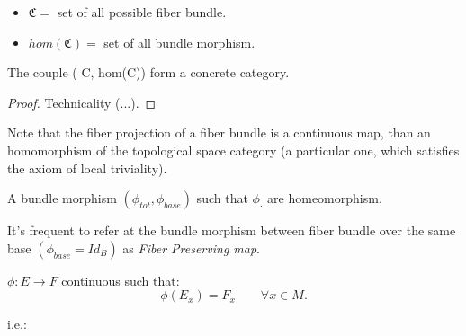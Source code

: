 \documentclass[a4paper,12pt]{scrartcl}    %
\begin{document}
\begin{proposition}
$$ $$
	\begin{hypothesis}
			\begin{itemize}
				\item $\mathfrak{C} = $ set of all possible fiber bundle.
				\item $hom(\mathfrak{C}) = $ set of all bundle morphism.
			\end{itemize}
	\end{hypothesis}
	\begin{thesis}
		The couple ( C, hom(C)) form a concrete category.
	\end{thesis}
\end{proposition}
\begin{proof}
	Technicality (...).
\end{proof}

\begin{observation}
Note that the fiber projection of a fiber bundle is a continuous map, than an homomorphism of the topological space category (a particular one, which satisfies the axiom of local triviality).
\end{observation}

\begin{definition}
A bundle morphism $(\phi_{tot}, \phi_{base})$ such that $\phi_{\cdot}$ are homeomorphism.
\end{definition}

\begin{notationfix}
It's frequent to refer at the bundle morphism between fiber bundle over the same base $( \phi_{base} = Id_{B} )$ as \emph{Fiber Preserving map}.

$\phi: E \rightarrow F $ continuous such that:
\begin{displaymath}
\phi(E_{x})= F_{x} \qquad \forall x \in M.
\end{displaymath}

i.e.:

\end{notationfix}
\end{document}
